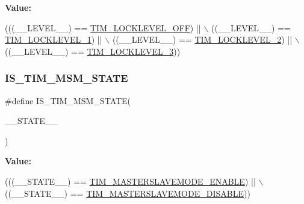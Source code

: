 {\bfseries Value\+:}
\begin{DoxyCode}
(((\_\_LEVEL\_\_) == \hyperlink{group___t_i_m___lock__level_ga304aece56a9391a4d9b1016144d98fbd}{TIM\_LOCKLEVEL\_OFF}) || \(\backslash\)
                                            ((\_\_LEVEL\_\_) == \hyperlink{group___t_i_m___lock__level_ga46dc7705788ba2ce5135c43b998ef4dd}{TIM\_LOCKLEVEL\_1})   || \(\backslash\)
                                            ((\_\_LEVEL\_\_) == \hyperlink{group___t_i_m___lock__level_ga03a5ed2aded43ccfe7ab12a9dd53d251}{TIM\_LOCKLEVEL\_2})   || \(\backslash\)
                                            ((\_\_LEVEL\_\_) == \hyperlink{group___t_i_m___lock__level_gaa1afed375c27151608e388fdf4a57a13}{TIM\_LOCKLEVEL\_3}))
\end{DoxyCode}
\mbox{\label{group___t_i_m___private___macros_gafac5c2fba615264d7a1de6f85cfccc9a}} 
\subsubsection{\texorpdfstring{I\+S\+\_\+\+T\+I\+M\+\_\+\+M\+S\+M\+\_\+\+S\+T\+A\+TE}{IS\_TIM\_MSM\_STATE}}
{\footnotesize\ttfamily \#define I\+S\+\_\+\+T\+I\+M\+\_\+\+M\+S\+M\+\_\+\+S\+T\+A\+TE(\begin{DoxyParamCaption}\item[{}]{\+\_\+\+\_\+\+S\+T\+A\+T\+E\+\_\+\+\_\+ }\end{DoxyParamCaption})}

{\bfseries Value\+:}
\begin{DoxyCode}
(((\_\_STATE\_\_) == \hyperlink{group___t_i_m___master___slave___mode_gafdc0de07db4688aa8c87cf03220aaf28}{TIM\_MASTERSLAVEMODE\_ENABLE}) || \(\backslash\)
                                          ((\_\_STATE\_\_) == 
      \hyperlink{group___t_i_m___master___slave___mode_ga58ff99ef1d6d6f187e3615f9d3ec3b8b}{TIM\_MASTERSLAVEMODE\_DISABLE}))
\end{DoxyCode}
\mbox{\label{group___t_i_m___private___macros_gac6968ae64781c2bda9f8714fe45917d0}} 

